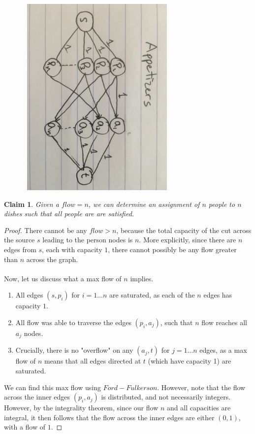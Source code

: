 \documentclass[11pt]{article}
\newtheorem{claim}[theorem]{Claim}
\begin{document}
\begin{center}
\includegraphics[width=10cm,height=10cm,keepaspectratio]{q2_appetizers}
\end{center}

\begin{claim}
Given a $flow = n$, we can determine an assignment of $n$ people to $n$ dishes such that all people are are satisfied.
\end{claim}

\begin{proof}
There cannot be any $flow > n$, because the total capacity of the cut across the source $s$ leading to the person nodes is $n$. More explicitly, since there are $n$ edges from $s$, each with capacity $1$, there cannot possibly be any flow greater than $n$ across the graph.\\
\\
Now, let us discuss what a max flow of $n$ implies.
\begin{enumerate}
\item All edges $(s, p_i)$ for $i = 1 ... n$ are saturated, as each of the $n$ edges has capacity $1$.
\item All flow was able to traverse the edges $(p_i, a_j)$, such that $n$ flow reaches all $a_j$ nodes.
\item Crucially, there is no "overflow" on any $(a_j, t)$ for $j = 1...n$ edges, as a max flow of $n$ means that all edges directed at $t$ (which have capacity 1) are saturated.
\end{enumerate}

We can find this max flow using $Ford-Fulkerson$. However, note that the flow across the inner edges $(p_i, a_j)$ is distributed, and not necessarily integers. However, by the integrality theorem, since our flow $n$ and all capacities are integral, it then follows that the flow across the inner edges are either $(0, 1)$, with a flow of $1$.
\end{proof}
\end{document}
